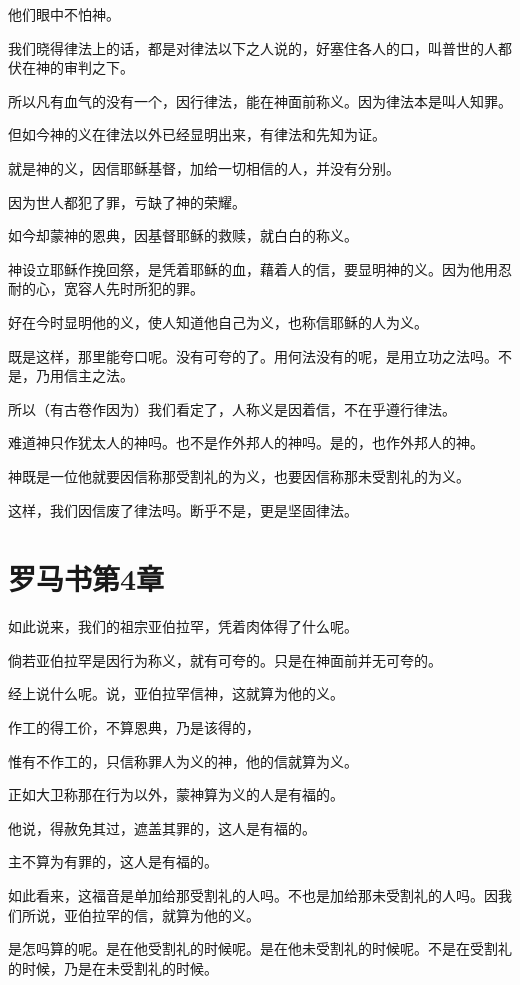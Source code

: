 \documentclass[12pt,oneside]{book}
\begin{document}
他们眼中不怕神。

我们晓得律法上的话，都是对律法以下之人说的，好塞住各人的口，叫普世的人都伏在神的审判之下。

所以凡有血气的没有一个，因行律法，能在神面前称义。因为律法本是叫人知罪。

但如今神的义在律法以外已经显明出来，有律法和先知为证。

就是神的义，因信耶稣基督，加给一切相信的人，并没有分别。

因为世人都犯了罪，亏缺了神的荣耀。

如今却蒙神的恩典，因基督耶稣的救赎，就白白的称义。

神设立耶稣作挽回祭，是凭着耶稣的血，藉着人的信，要显明神的义。因为他用忍耐的心，宽容人先时所犯的罪。

好在今时显明他的义，使人知道他自己为义，也称信耶稣的人为义。

既是这样，那里能夸口呢。没有可夸的了。用何法没有的呢，是用立功之法吗。不是，乃用信主之法。

所以（有古卷作因为）我们看定了，人称义是因着信，不在乎遵行律法。

难道神只作犹太人的神吗。也不是作外邦人的神吗。是的，也作外邦人的神。

神既是一位他就要因信称那受割礼的为义，也要因信称那未受割礼的为义。

这样，我们因信废了律法吗。断乎不是，更是坚固律法。

\chapter{罗马书第4章}
如此说来，我们的祖宗亚伯拉罕，凭着肉体得了什么呢。

倘若亚伯拉罕是因行为称义，就有可夸的。只是在神面前并无可夸的。

经上说什么呢。说，亚伯拉罕信神，这就算为他的义。

作工的得工价，不算恩典，乃是该得的，

惟有不作工的，只信称罪人为义的神，他的信就算为义。

正如大卫称那在行为以外，蒙神算为义的人是有福的。

他说，得赦免其过，遮盖其罪的，这人是有福的。

主不算为有罪的，这人是有福的。

如此看来，这福音是单加给那受割礼的人吗。不也是加给那未受割礼的人吗。因我们所说，亚伯拉罕的信，就算为他的义。

是怎吗算的呢。是在他受割礼的时候呢。是在他未受割礼的时候呢。不是在受割礼的时候，乃是在未受割礼的时候。
\end{document}
